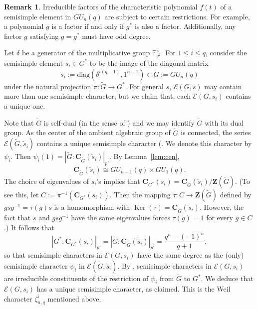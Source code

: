 \documentclass[12pt]{amsart}
\theoremstyle{plain}
\theoremstyle{definition}
\newtheorem{remark}[thm]{Remark}
\numberwithin{equation}{section}
\newcommand{\Ker}{\operatorname{Ker}}
\newcommand{\FF}{\mathbb{F}}
\newcommand{\diag}{{\mathrm {diag}}}
\newcommand{\bC}{{\mathbf{C}}}
\newcommand{\bZ}{{\mathbf{Z}}}
\begin{document}
\begin{remark}
Irreducible factors of the characteristic polynomial $f(t)$ of a
semisimple element in $GU_n(q)$ are subject to certain restrictions.
For example, a polynomial $g$ is a factor if and only if $g^*$ is
also a factor. Additionally, any factor $g$ satisfying $g=g^*$ must
have odd degree.
\end{remark}

Let $\delta$ be a generator of the multiplicative group
$\FF_{q^2}^\times$. For $1\leq i\leq q$, consider the semisimple
element $s_i\in G^*$ to be the image of the diagonal matrix
\[\widetilde{s}_i:=\diag(\delta^{i(q-1)},1^{n-1})\in
\widetilde{G}:=GU_n(q)\] under the natural projection
$\pi:\widetilde{G}\to G^*$. For general $s$, $\mathcal{E}(G,s)$ may
contain more than one semisimple character, but we claim that, each
$\mathcal{E}(G,s_i)$ contains a unique one.



Note that $\widetilde{G}$ is self-dual (in the sense of
\cite[\S4.3]{Carter85}) and we may identify $\widetilde{G}$ with its
dual group. As the center of the ambient algebraic group of
$\widetilde{G}$ is connected, the series
$\mathcal{E}(\widetilde{G},\widetilde{s}_i)$ contains a unique
semisimple character (\cite[p.~171]{GM20}. We denote this character
by $\psi_i$. Then
$\psi_i(1)=|\widetilde{G}:\bC_{\widetilde{G}}(\widetilde{s}_i)|_{p'}$.
By Lemma~\ref{lem:cen},
\[
\bC_{\widetilde{G}}(\widetilde{s}_i) \cong GU_{n-1}(q)\times
GU_1(q).
\]
The choice of eigenvalues of $s_i$'s implies that
$\bC_{G^*}(s_i)=\bC_{\widetilde{G}}(\widetilde{s}_i)/\bZ(\widetilde{G})$.
(To see this, let $C:=\pi^{-1}(\bC_{G^*}(s_i))$. Then the mapping
$\tau: C\to \bZ(\widetilde{G})$ defined by $gsg^{-1}=\tau(g)s$ is a
homomorphism with $\Ker(\tau)=\bC_{\widetilde{G}}(\widetilde{s}_i)$.
However, the fact that $s$ and $gsg^{-1}$ have the same eigenvalues
forces $\tau(g)=1$ for every $g\in C$.) It follows that
\[
|G^*:\bC_{G^*}(s_i)|_{p'}=|\widetilde{G}:\bC_{\widetilde{G}}(\widetilde{s}_i)|_{p'}=\frac{q^n-(-1)^n}{q+1},
\]
so that semisimple characters in $\mathcal{E}(G,s_i)$ have the same
degree as the (only) semisimple character $\psi_i$ in
$\mathcal{E}(\widetilde{G},\widetilde{s}_i)$. By
\cite[Corollary~2.6.18]{GM20}, semisimple characters in
$\mathcal{E}(G,s_i)$ are irreducible constituents of the restriction
of $\psi_i$ from $\widetilde{G}$ to $G^*$. We deduce that
$\mathcal{E}(G,s_i)$ has a unique semisimple character, as claimed.
This is the Weil character $\zeta^i_{n,q}$ mentioned above.
\end{document}
